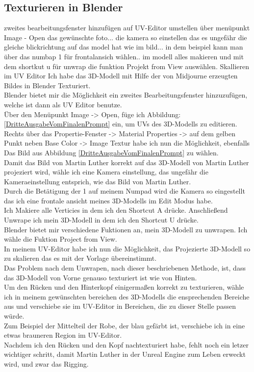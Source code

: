 \subsection{Texturieren in Blender}
zweites bearbeitungsfenster hinzufügen auf UV-Editor umstellen über menüpunkt Image - Open das gewünschte foto... die kamera so einstellen das es ungefähr die gleiche blickrichtung auf das model hat wie im bild... in dem beispiel kann man über das numbap 1 für frontalansich wählen..
im modell alles makieren und mit dem shortkut u für unwrap die funktion Projekt from View auswählen.
Skallieren im UV Editor
Ich habe das 3D-Modell mit Hilfe der von Midjourne erzeugten Bildes in Blender Texturiert.
\\
Blender bietet mir die Möglichkeit ein zweites Bearbeitungsfenster hinzuzufügen, welche ist dann als UV Editor benutze.
\\
Über den Menüpunkt Image -> Open, füge ich Abbildung: \ref{DritteAusgabeVomFinalenPrompt} ein, um UVs des 3D-Modells zu editieren.
\\
Rechts über das Propertie-Fenster -> Material Properties -> auf dem gelben Punkt neben Base Color -> Image Textur habe ich nun die Möglichkeit, ebenfalls Das Bild aus Abbildung \ref{DritteAusgabeVomFinalenPrompt} zu wählen.
\\
Damit das Bild von Martin Luther korrekt auf das 3D-Modell von Martin Luther projeziert wird, wähle ich eine Kamera einstellung, das ungefähr die Kameraeinstellung entsprich, wie das Bild von Martin Luther.
\\
Durch die Betätigung der 1 auf meinem Numpad wird die Kamera so eingestellt das ich eine frontale ansicht meines 3D-Modells im Edit Modus habe.
\\
Ich Makiere alle Verticies in dem ich den Shortcut A drücke. Anschließend Unwrape ich mein 3D-Modell in dem ich den Shortcut U drücke.
\\
Blender bietet mir verschiedene Fuktionen an, mein 3D-Modell zu unwrapen. Ich wähle die Fuktion Project from View.
\\
In meinem UV-Editor habe ich nun die Möglichkeit, das Projezierte 3D-Modell so zu skalieren das es mit der Vorlage übereinstimmt.
\\
Das Problem nach dem Unwrapen, nach dieser beschriebenen Methode, ist, dass das 3D-Modell von Vorne genauso texturiert ist wie von Hinten.
\\
Um den Rücken und den Hinterkopf einigermaßen korrekt zu texturieren, wähle ich in meinem gewünschten bereichen des 3D-Modells die ensprechenden Bereiche aus und verschiebe sie im UV-Editor in Bereichen, die zu dieser Stelle passen würde.
\\
Zum Beispiel der Mittelteil der Robe, der blau gefärbt ist, verschiebe ich in eine etwas brauneren Region im UV-Editor.
\\
Nachdem ich den Rücken und den Kopf nachtexturiert habe, fehlt noch ein letzer wichtiger schritt, damit Martin Luther in der Unreal Engine zum Leben erweckt wird, und zwar das Rigging.

